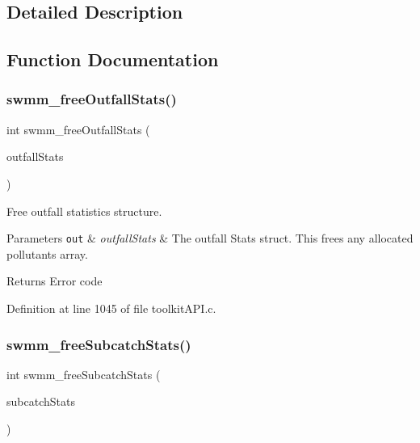 \subsection{Detailed Description}


\subsection{Function Documentation}
\mbox{\label{group__tkfuncs_ga24874b7dc37c161521f0c14899c2157d}} 
\subsubsection{\texorpdfstring{swmm\+\_\+free\+Outfall\+Stats()}{swmm\_freeOutfallStats()}}
{\footnotesize\ttfamily int swmm\+\_\+free\+Outfall\+Stats (\begin{DoxyParamCaption}\item[{\hyperlink{struct_s_m___outfall_stats}{S\+M\+\_\+\+Outfall\+Stats} $\ast$}]{outfall\+Stats }\end{DoxyParamCaption})}



Free outfall statistics structure. 


\begin{DoxyParams}[1]{Parameters}
\mbox{\tt out}  & {\em outfall\+Stats} & The outfall Stats struct. This frees any allocated pollutants array. \\
\hline
\end{DoxyParams}
\begin{DoxyReturn}{Returns}
Error code 
\end{DoxyReturn}


Definition at line 1045 of file toolkit\+A\+P\+I.\+c.

\mbox{\label{group__tkfuncs_gaf24dfaf8bcd92298782f2449aa18a2f5}} 
\subsubsection{\texorpdfstring{swmm\+\_\+free\+Subcatch\+Stats()}{swmm\_freeSubcatchStats()}}
{\footnotesize\ttfamily int swmm\+\_\+free\+Subcatch\+Stats (\begin{DoxyParamCaption}\item[{\hyperlink{struct_s_m___subcatch_stats}{S\+M\+\_\+\+Subcatch\+Stats} $\ast$}]{subcatch\+Stats }\end{DoxyParamCaption})}



